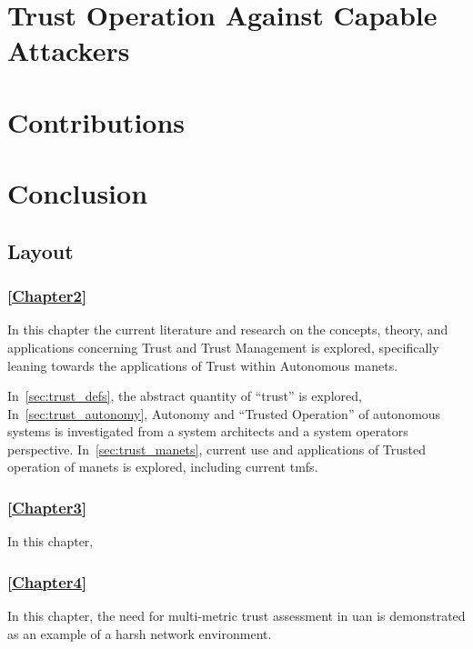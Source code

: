 \section{Trust Operation Against Capable Attackers}\label{sec:capable_attackers}


\section{Contributions}


\section{Conclusion}


\subsection{Layout}

\subsubsection{\autoref{Chapter2}}
In this chapter the current literature and research on the concepts, theory, and applications concerning Trust and Trust Management is explored, specifically leaning towards the applications of Trust within Autonomous \glspl{manet}.

In~\autoref{sec:trust_defs}, the abstract quantity of ``trust'' is explored,
In~\autoref{sec:trust_autonomy}, Autonomy and ``Trusted Operation'' of autonomous systems is investigated from a system architects and a system operators perspective.
In~\autoref{sec:trust_manets}, current use and applications of Trusted operation of \glspl{manet} is explored, including current \glspl{tmf}.

\subsubsection{\autoref{Chapter3}}
In this chapter, 

\subsubsection{\autoref{Chapter4}}
In this chapter, the need for multi-metric trust assessment in \gls{uan} is demonstrated as an example of a harsh network environment.

